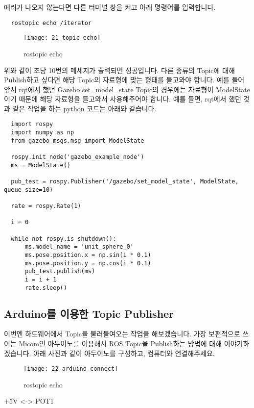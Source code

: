 \documentclass[11pt,fleqn]{book} %
\begin{document}
에러가 나오지 않는다면 다른 터미널 창을 켜고 아래 명령어를 입력합니다.

\begin{verbatim}
  rostopic echo /iterator
\end{verbatim}

\begin{figure}[h]
\centering\texttt{[image: 21\_topic\_echo]}
\caption{rostopic echo}
\end{figure}

위와 같이 초당 10번의 메세지가 출력되면 성공입니다. 다른 종류의 Topic에 대해 Publish하고 싶다면 해당 Topic의 자료형에 맞는 형태를 들고와야 합니다.
예를 들어 앞서 rqt에서 했던 Gazebo set\_model\_state Topic의 경우에는 자료형이 ModelState이기 때문에 해당 자료형을 들고와서 사용해주어야 합니다.
예를 들면, rqt에서 했던 것과 같은 작업을 하는 python 코드는 아래와 같습니다.

\begin{verbatim}
  import rospy
  import numpy as np
  from gazebo_msgs.msg import ModelState

  rospy.init_node('gazebo_example_node')
  ms = ModelState()

  pub_test = rospy.Publisher('/gazebo/set_model_state', ModelState, queue_size=10)

  rate = rospy.Rate(1)

  i = 0

  while not rospy.is_shutdown():
      ms.model_name = 'unit_sphere_0'
      ms.pose.position.x = np.sin(i * 0.1)
      ms.pose.position.y = np.cos(i * 0.1)
      pub_test.publish(ms)
      i = i + 1
      rate.sleep()

\end{verbatim}

\subsection{Arduino를 이용한 Topic Publisher}

이번엔 하드웨어에서 Topic을 불러들여오는 작업을 해보겠습니다.
가장 보편적으로 쓰이는 Micom인 아두이노를 이용해서 ROS Topic을 Publish하는 방법에 대해 이야기하겠습니다.
아래 사진과 같이 아두이노를 구성하고, 컴퓨터와 연결해주세요.

\begin{figure}[h]
\centering\texttt{[image: 22\_arduino\_connect]}
\caption{rostopic echo}
\end{figure}

+5V <-> POT1
\end{document}
